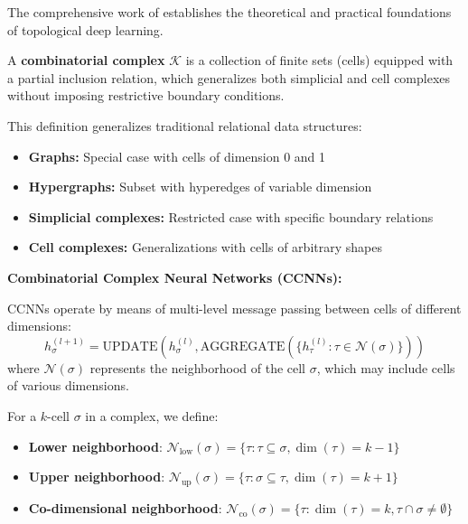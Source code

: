 The comprehensive work of \citet{hajij2023topological} establishes the theoretical and practical foundations of topological deep learning.

\begin{definition}\label{def:complejo_combinatorial}
A \textbf{combinatorial complex} $\mathcal{K}$ is a collection of finite sets (cells) equipped with a partial inclusion relation, which generalizes both simplicial and cell complexes without imposing restrictive boundary conditions.
\end{definition}

This definition generalizes traditional relational data structures:
\begin{itemize}
    \item \textbf{Graphs:} Special case with cells of dimension 0 and 1
    \item \textbf{Hypergraphs:} Subset with hyperedges of variable dimension
    \item \textbf{Simplicial complexes:} Restricted case with specific boundary relations
    \item \textbf{Cell complexes:} Generalizations with cells of arbitrary shapes
\end{itemize}

\textbf{Combinatorial Complex Neural Networks (CCNNs):}

CCNNs operate by means of multi-level message passing between cells of different dimensions:
\[h_\sigma^{(l+1)} = \text{UPDATE}\left(h_\sigma^{(l)}, \text{AGGREGATE}\left(\{h_\tau^{(l)} : \tau \in \mathcal{N}(\sigma)\}\right)\right)\]
where $\mathcal{N}(\sigma)$ represents the neighborhood of the cell $\sigma$, which may include cells of various dimensions.

\begin{definition}\label{def:vecindarios_complejos}
For a $k$-cell $\sigma$ in a complex, we define:
\begin{itemize}
    \item \textbf{Lower neighborhood}: $\mathcal{N}_{\text{low}}(\sigma) = \{\tau : \tau \subseteq \sigma, \dim(\tau) = k-1\}$
    \item \textbf{Upper neighborhood}: $\mathcal{N}_{\text{up}}(\sigma) = \{\tau : \sigma \subseteq \tau, \dim(\tau) = k+1\}$
    \item \textbf{Co-dimensional neighborhood}: $\mathcal{N}_{\text{co}}(\sigma) = \{\tau : \dim(\tau) = k, \tau \cap \sigma \neq \emptyset\}$
\end{itemize}
\end{definition}

